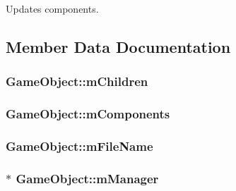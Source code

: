 Updates components. 



\subsection{Member Data Documentation}
\subsubsection[{\texorpdfstring{m\+Children}{mChildren}}]{ Game\+Object\+::m\+Children\hspace{0.3cm}{\ttfamily [private]}}\hypertarget{classGameObject_a2f2256cb6c1402291d28595f3a83fd3b}{}\label{classGameObject_a2f2256cb6c1402291d28595f3a83fd3b}
\subsubsection[{\texorpdfstring{m\+Components}{mComponents}}]{ Game\+Object\+::m\+Components\hspace{0.3cm}{\ttfamily [private]}}\hypertarget{classGameObject_a8706053a7d9e9e16d2932ddd174d0b68}{}\label{classGameObject_a8706053a7d9e9e16d2932ddd174d0b68}
\subsubsection[{\texorpdfstring{m\+File\+Name}{mFileName}}]{ Game\+Object\+::m\+File\+Name\hspace{0.3cm}{\ttfamily [private]}}\hypertarget{classGameObject_ac9cf51e46f7a63be42d4b2ee88777999}{}\label{classGameObject_ac9cf51e46f7a63be42d4b2ee88777999}
\subsubsection[{\texorpdfstring{m\+Manager}{mManager}}]{$\ast$ Game\+Object\+::m\+Manager\hspace{0.3cm}{\ttfamily [private]}}\hypertarget{classGameObject_a712b44bcb5814c6924bdb3f399f43969}{}\label{classGameObject_a712b44bcb5814c6924bdb3f399f43969}
